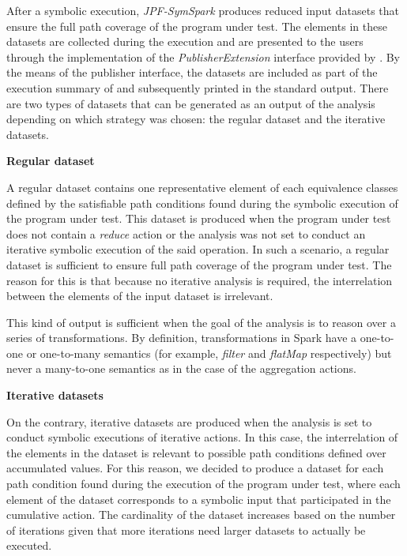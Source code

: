 \label{subsec:module:output}

%
%

After a symbolic execution, \textit{JPF-SymSpark} produces reduced input datasets that ensure the full path coverage of the program under test. The elements in these datasets are collected during the execution and are presented to the users through the implementation of the \textit{PublisherExtension} interface provided by \jpf{}. By the means of the publisher interface, the datasets are included as part of the execution summary of \jpf{} and subsequently printed in the standard output. There are two types of datasets that can be generated as an output of the analysis depending on which strategy was chosen: the regular dataset and the iterative datasets.

\textbf{Regular dataset}

A regular dataset contains one representative element of each equivalence classes defined by the satisfiable path conditions found during the symbolic execution of the program under test. This dataset is produced when the program under test does not contain a \textit{reduce} action or the analysis was not set to conduct an iterative symbolic execution of the said operation. In such a scenario, a regular dataset is sufficient to ensure full path coverage of the program under test. The reason for this is that because no iterative analysis is required, the interrelation between the elements of the input dataset is irrelevant. 

This kind of output is sufficient when the goal of the analysis is to reason over a series of transformations. By definition, transformations in Spark have a one-to-one or one-to-many semantics (for example, \textit{filter} and \textit{flatMap} respectively) but never a many-to-one semantics as in the case of the aggregation actions. 

\textbf{Iterative datasets}

On the contrary, iterative datasets are produced when the analysis is set to conduct symbolic executions of iterative actions. In this case, the interrelation of the elements in the dataset is relevant to possible path conditions defined over accumulated values. For this reason, we decided to produce a dataset for each path condition found during the execution of the program under test, where each element of the dataset corresponds to a symbolic input that participated in the cumulative action. The cardinality of the dataset increases based on the number of iterations given that more iterations need larger datasets to actually be executed.

